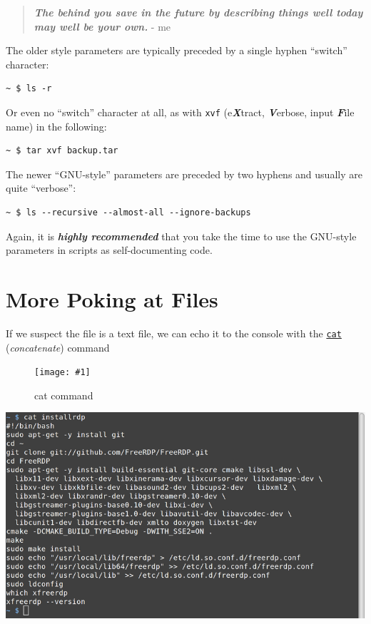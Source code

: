 \documentclass[10pt,]{book}
\numberwithin{figure}{chapter}
\DeclareRobustCommand{\fimg}[3]{
\ifxetex
\begin{figure}[H]
\texttt{[image: \#1]}
\caption{#2}
\label{fig:#3}
\end{figure}
\fi}
\DeclareRobustCommand{\fref}[1]{\ifxetex{(Figure \ref{fig:#1})}\fi}
\begin{document}
\begin{quote}
\textbf{\emph{The behind you save in the future by describing things
well today may well be your own.}} - me
\end{quote}

The older style parameters are typically preceded by a single hyphen
``switch'' character:

\begin{verbatim}
~ $ ls -r
\end{verbatim}

Or even no ``switch'' character at all, as with \texttt{xvf}
(e\textbf{\emph{X}}tract, \textbf{\emph{V}}erbose, input
\textbf{\emph{F}}ile name) in the following:

\begin{verbatim}
~ $ tar xvf backup.tar
\end{verbatim}

The newer ``GNU-style'' parameters are preceded by two hyphens and
usually are quite ``verbose'':

\begin{verbatim}
~ $ ls --recursive --almost-all --ignore-backups
\end{verbatim}

Again, it is \textbf{\emph{highly recommended}} that you take the time
to use the GNU-style parameters in scripts as self-documenting code.

\section{More Poking at Files}\label{more-poking-at-files}

If we suspect the file is a text file, we can echo it to the console
with the \href{http://linux.die.net/man/1/cat}{\texttt{cat}}
(\emph{concatenate}) command ~\fref{cat}

\ifxetex\fimg{./images/cat.png}{cat command}{cat} \else
\includegraphics{./images/cat.png} \fi
\end{document}
